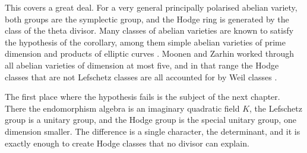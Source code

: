 This covers a great deal. For a very general principally polarised
abelian variety, both groups are the symplectic group, and the Hodge ring
is generated by the class of the theta divisor. Many classes of abelian
varieties are known to satisfy the hypothesis of the corollary, among them
simple abelian varieties of prime dimension and products of elliptic
curves \cite{Rib83,BL04}. Moonen and Zarhin worked through all abelian
varieties of dimension at most five, and in that range the Hodge classes
that are not Lefschetz classes are all accounted for by Weil classes
\cite{MZ99}.

The first place where the hypothesis fails is the subject of the next
chapter. There the endomorphism algebra is an imaginary quadratic field
$K$, the Lefschetz group is a unitary group, and the Hodge group is the
special unitary group, one dimension smaller. The difference is a single
character, the determinant, and it is exactly enough to create Hodge
classes that no divisor can explain.
